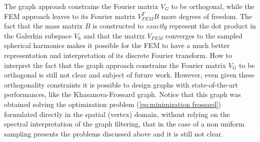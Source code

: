 The graph approach constrains the Fourier matrix $V_G$ to be orthogonal, while the FEM approach leaves to its Fourier matrix $V_{FEM}^TB$ more degrees of freedom. The fact that the mass matrix $B$ is constructed to \textit{exactly} represent the dot product in the Galerkin subspace $V_h$ and that the matrix $V_{FEM}$ converges to the sampled spherical harmonics makes it possible for the FEM to have a much better representation and interpretation of its discrete Fourier transform. How to interpret the fact that the graph approach constrains the Fourier matrix $V_G$ to be orthogonal is still not clear and subject of future work. However, even given these orthogonality constraints it is possible to design graphs with state-of-the-art performances, like the Khasanova-Frossard graph. Notice that this graph was obtained solving the optimization problem (\ref{eq:minimization frossard}) formulated directly in the spatial (vertex) domain, without relying on the spectral interpretation of the graph filtering, that in the case of a non uniform sampling presents the problems discussed above and it is still not clear. 


